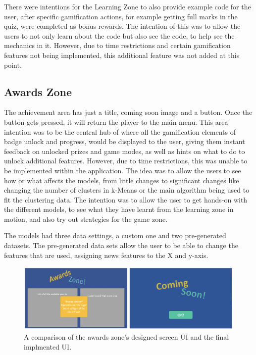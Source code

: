 	There were intentions for the Learning Zone to also provide example code for the user, after specific gamification actions, for example getting full marks in the quiz, were completed as bonus rewards. The intention of this was to allow the users to not only learn about the code but also see the code, to help see the mechanics in it. However, due to time restrictions and certain gamification features not being implemented, this additional feature was not added at this point.
	
	
	
	\subsection{Awards Zone}
	
	
	The achievement area has just a title, coming soon image and a button. Once the button gets pressed, it will return the player to the main menu. This area intention was to be the central hub of where all the gamification elements of badge unlock and progress, would be displayed to the user, giving them instant feedback on unlocked prizes and game modes,  as well as hints on what to do to unlock additional features. However, due to time restrictions, this was unable to be implemented within the application. The idea was to allow the users to see how or what affects the models, from little changes to significant changes like changing the number of clusters in k-Means or the main algorithm being used to fit the clustering data. The intention was to allow the user to get hands-on with the different models, to see what they have learnt from the learning zone in motion, and also try out strategies for the game zone. 
	
	The models had three data settings, a custom one and two pre-generated datasets. The pre-generated data sets allow the user to be able to change the features that are used, assigning news features to the X and y-axis.
	
	\begin{figure}[t]
		\includegraphics[width=15cm]{graphics/awards_zone.png}
		\caption{A comparison of the awards zone's designed screen UI and the final implmented UI.}
		\label{fig:ui_az}
	\end{figure}
	
